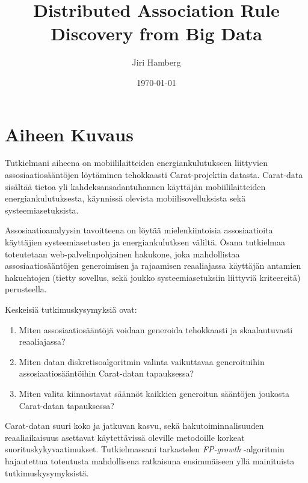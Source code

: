 \documentclass[finnish]{tktltiki2}
\title{Distributed Association Rule Discovery from Big Data}
\author{Jiri Hamberg}
\date{\today}
\theoremstyle{definition}
\theoremstyle{remark}
\begin{document}


\maketitle        %



\mainmatter       %

\section*{Aiheen Kuvaus}

Tutkielmani aiheena on mobiililaitteiden energiankulutukseen liittyvien assosiaatiosääntöjen löytäminen tehokkaasti Carat-projektin datasta. Carat-data sisältää tietoa yli kahdeksansadantuhannen käyttäjän mobiililaitteiden energiankulutuksesta, käynnissä olevista mobiilisovelluksista sekä systeemiasetuksista. 

Assosiaatioanalyysin tavoitteena on löytää mielenkiintoisia assosiaatioita käyttäjien systeemiasetusten ja energiankulutksen väliltä. Osana tutkielmaa toteutetaan web-palvelinpohjainen hakukone, joka mahdollistaa assosiaatiosääntöjen generoimisen ja rajaamisen reaaliajassa käyttäjän antamien hakuehtojen (tietty sovellus, sekä joukko systeemiasetuksiin liittyviä kriteereitä) perusteella.

Keskeisiä tutkimuskysymyksiä ovat: 

\begin{enumerate}
	\item Miten assosiaatiosääntöjä voidaan generoida tehokkaasti ja skaalautuvasti reaaliajassa?
	\item Miten datan diskretisoalgoritmin valinta vaikuttavaa generoituihin assosiaatiosääntöihin Carat-datan tapauksessa?
	\item Miten valita kiinnostavat säännöt kaikkien generoitun sääntöjen joukosta Carat-datan tapauksessa? 
\end{enumerate}

Carat-datan suuri koko ja jatkuvan kasvu, sekä hakutoiminnalisuuden reaaliaikaisuus asettavat käytettävissä oleville metodoille korkeat suorituskykyvaatimukset. Tutkielmassani tarkastelen \textit{FP-growth} -algoritmin hajautettua toteutusta mahdollisena ratkaisuna ensimmäiseen yllä mainituista tutkimuskysymyksistä.  
\end{document}
